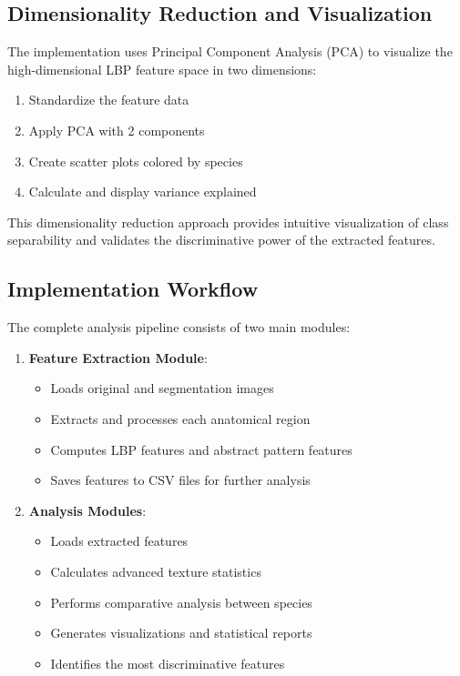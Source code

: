 \documentclass[a4paper,12pt]{report}
\begin{document}
\subsection{Dimensionality Reduction and Visualization}

The implementation uses Principal Component Analysis (PCA) to visualize the high-dimensional LBP feature space in two dimensions:

\begin{enumerate}
    \item Standardize the feature data
    \item Apply PCA with 2 components
    \item Create scatter plots colored by species
    \item Calculate and display variance explained
\end{enumerate}

This dimensionality reduction approach provides intuitive visualization of class separability and validates the discriminative power of the extracted features.

\subsection{Implementation Workflow}

The complete analysis pipeline consists of two main modules:

\begin{enumerate}
    \item \textbf{Feature Extraction Module}:
    \begin{itemize}
        \item Loads original and segmentation images
        \item Extracts and processes each anatomical region
        \item Computes LBP features and abstract pattern features
        \item Saves features to CSV files for further analysis
    \end{itemize}

    \item \textbf{Analysis Modules}:
    \begin{itemize}
        \item Loads extracted features
        \item Calculates advanced texture statistics
        \item Performs comparative analysis between species
        \item Generates visualizations and statistical reports
        \item Identifies the most discriminative features
    \end{itemize}
\end{enumerate}
\end{document}
